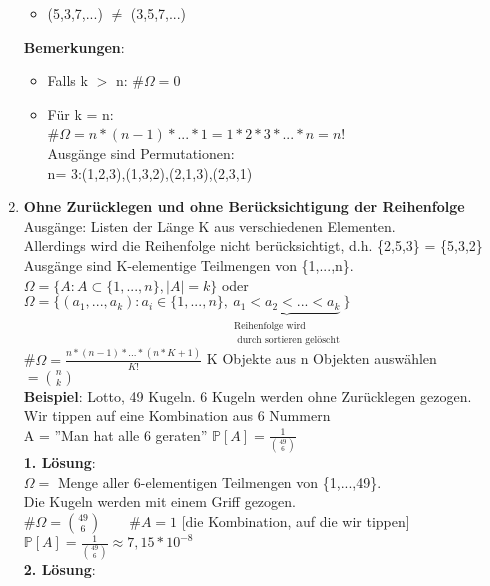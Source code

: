 \begin{enumerate}
\begin{itemize}
		\item (5,3,7,...) $\neq$ (3,5,7,...)
	\end{itemize}
	\textbf{Bemerkungen}: 
	\begin{itemize}
		\item Falls k $>$ n: \#$\Omega = 0$
		\item Für k = n:\\
		\#$\Omega = n*(n-1)*...*1 = 1*2*3*...*n = n!$\\Ausgänge sind Permutationen:\\n= 3:(1,2,3),(1,3,2),(2,1,3),(2,3,1)
	\end{itemize}
	\item \textbf{Ohne Zurücklegen und ohne Berücksichtigung der Reihenfolge}\\
	Ausgänge: Listen der Länge K aus verschiedenen Elementen.\\
	Allerdings wird die Reihenfolge nicht berücksichtigt, d.h. \{2,5,3\} = \{5,3,2\}\smallskip\\
	Ausgänge sind K-elementige Teilmengen von \{1,...,n\}.\medskip\\
	$\Omega = \{A:A\subset\{1,...,n\},|A| = k\}$ oder \\
	$\Omega = \{(a_1,...,a_k):a_i \in \{1,...,n\},\underbrace{a_1<a_2<...<a_k}_{\substack{\text{Reihenfolge wird}\\\text{ durch sortieren gelöscht}}} \}$\medskip\\
	\#$\Omega = \frac{n*(n-1)*...*(n*K+1)}{K!}$ \hspace{0.5cm}K Objekte aus n Objekten auswählen\smallskip\\
	$ = \binom{n}{k}$\medskip\\
	\textbf{Beispiel}: Lotto, 49 Kugeln. 6 Kugeln werden ohne Zurücklegen gezogen.\\ 
	Wir tippen auf eine Kombination aus 6 Nummern\smallskip\\
	A = ''Man hat alle 6 geraten'' $\mathds{P}[A] = \frac{1}{\binom{49}{6}}$\medskip\\
	\textbf{1. Lösung}:\\
	$\Omega = $ Menge aller 6-elementigen Teilmengen von \{1,...,49\}. \\
	Die Kugeln werden mit einem Griff gezogen.\medskip\\
	\#$\Omega = \binom{49}{6} \qquad \#A = 1$ [die Kombination, auf die wir tippen]\medskip\\
	$\mathds{P}[A] = \frac{1}{\binom{49}{6}} \approx 7,15*10^{-8}$\medskip\\
	\textbf{2. Lösung}:\\

\end{enumerate}
